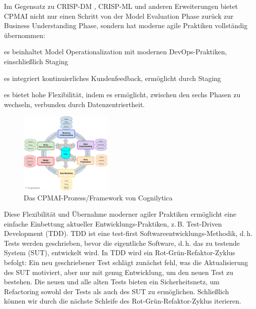 \documentclass[twocolumn]{article}
\begin{document}
Im Gegensatz zu CRISP-DM \cite{CRISP99}, CRISP-ML \cite{Studer21} und anderen Erweiterungen bietet CPMAI nicht nur einen Schritt von der Model Evaluation Phase zurück zur Business Understanding Phase, sondern hat moderne agile Praktiken vollständig übernommen:
\begin{compactitem}
\item es beinhaltet Model Operationalization mit modernen DevOps-Praktiken, einschließlich Staging
\item es integriert kontinuierliches Kundenfeedback, ermöglicht durch Staging
\item es bietet hohe Flexibilität, indem es ermöglicht, zwischen den sechs Phasen zu wechseln, verbunden durch Datenzentriertheit.
\end{compactitem}

\begin{figure}[hbt!]
  \begin{center}
  \vspace{-4mm}
\includegraphics[width=0.4\textwidth]{figures/cpmai}
  \vspace{-4mm}
\caption{Das CPMAI-Prozess/Framework von Cognilytica}
\label{fig:cpmai}
\end{center}
\end{figure}

Diese Flexibilität und Übernahme moderner agiler Praktiken ermöglicht eine einfache Einbettung aktueller Entwicklungs-Praktiken, z.\,B. Test-Driven Development (TDD). TDD ist eine test-first Softwareentwicklungs-Methodik, d.\,h. Tests werden geschrieben, bevor die eigentliche Software, d.\,h. das zu testende System (SUT), entwickelt wird. In TDD wird ein Rot-Grün-Refaktor-Zyklus befolgt: Ein neu geschriebener Test schlägt zunächst fehl, was die Aktualisierung des SUT motiviert, aber nur mit genug Entwicklung, um den neuen Test zu bestehen. Die neuen und alle alten Tests bieten ein Sicherheitsnetz, um Refactoring sowohl der Tests als auch des SUT zu ermöglichen. Schließlich können wir durch die nächste Schleife des Rot-Grün-Refaktor-Zyklus iterieren.
\end{document}
